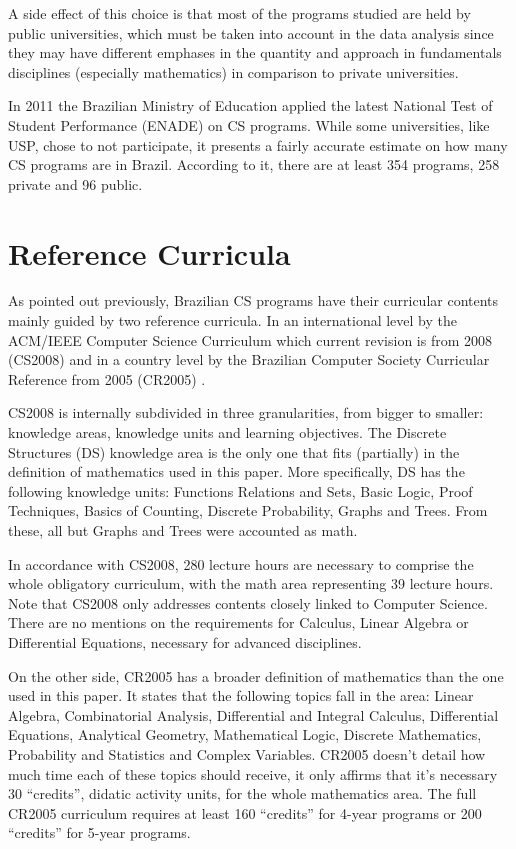 \documentclass[conference]{IEEEtran}
\begin{document}
	A side effect of this choice is that most of the programs studied are held by public universities, which must be taken into account in the data analysis since they may have different emphases in the quantity and approach in fundamentals disciplines (especially mathematics) in comparison to private universities.
	
	In 2011 the Brazilian Ministry of Education applied the latest National Test of Student Performance (ENADE) on CS programs. While some universities, like USP, chose to not participate, it presents a fairly accurate estimate on how many CS programs are in Brazil. According to it, there are at least 354 programs, 258 private and 96 public. \cite{enade} 

\section{Reference Curricula}
	As pointed out previously, Brazilian CS programs have their curricular contents mainly guided by two reference curricula. In an international level by the ACM/IEEE Computer Science Curriculum which current revision is from 2008 (CS2008) \cite{cs2008} and in a country level by the Brazilian Computer Society Curricular Reference from 2005 (CR2005) \cite{sbc}.

	CS2008 is internally subdivided in three granularities, from bigger to smaller: knowledge areas, knowledge units and learning objectives. The Discrete Structures (DS) knowledge area is the only one that fits (partially) in the definition of mathematics used in this paper. More specifically, DS has the following knowledge units: Functions Relations and Sets, Basic Logic, Proof Techniques, Basics of Counting, Discrete Probability, Graphs and Trees. From these, all but Graphs and Trees were accounted as math.

	In accordance with CS2008, 280 lecture hours are necessary to comprise the whole obligatory curriculum, with the math area representing 39 lecture hours. \cite{cs2008} Note that CS2008 only addresses contents closely linked to Computer Science. There are no mentions on the requirements for Calculus, Linear Algebra or Differential Equations, necessary for advanced disciplines.

	On the other side, CR2005 has a broader definition of mathematics than the one used in this paper. It states that the following topics fall in the area: Linear Algebra, Combinatorial Analysis, Differential and Integral Calculus, Differential Equations, Analytical Geometry, Mathematical Logic, Discrete Mathematics, Probability and Statistics and Complex Variables. CR2005 doesn't detail how much time each of these topics should receive, it only affirms that it's necessary 30 ``credits'', didatic activity units, for the whole mathematics area. The full CR2005 curriculum requires at least 160 ``credits'' for 4-year programs or 200 ``credits'' for 5-year programs.
\end{document}
